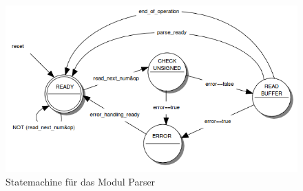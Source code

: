 \begin{figure}[!ht]
	\centering
	\includegraphics[scale=0.5]{figures/parser.png} 
	\caption{Statemachine für das Modul Parser}
	\label{fig:parser}
\end{figure}


